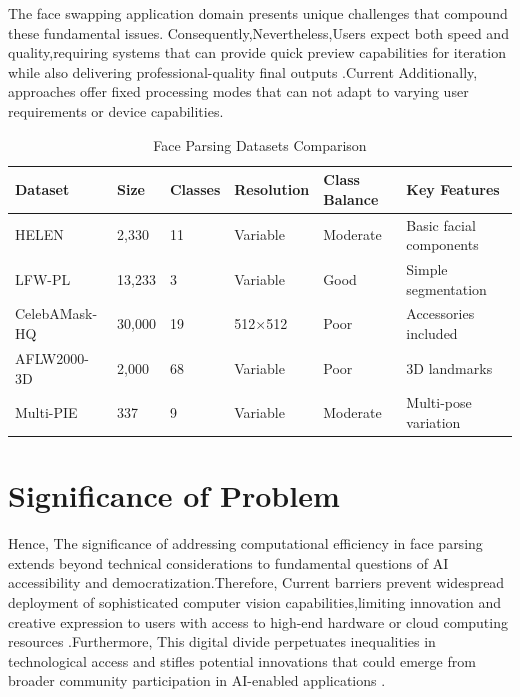 \documentclass[12pt,a4paper]{report}
\begin{document}
The face swapping application domain presents unique challenges that compound these fundamental issues. Consequently,Nevertheless,Users expect both speed and quality,requiring systems that can provide quick preview capabilities for iteration while also delivering professional-quality final outputs \cite{nirkin2019fsgan} .Current Additionally, approaches offer fixed processing modes that can not adapt to varying user requirements or device capabilities.

\begin{table}[H]
\centering
\caption{Face Parsing Datasets Comparison}
\label{tab:datasets_comparison}
\begin{tabular}{|p{2.5cm}|p{1.5cm}|p{1.5cm}|p{2cm}|p{1.5cm}|p{2cm}|}
\hline
\textbf{Dataset} & \textbf{Size} & \textbf{Classes} & \textbf{Resolution} & \textbf{Class Balance} & \textbf{Key Features} \\
\hline
HELEN \cite{le2012interactive} & 2,330 & 11 & Variable & Moderate & Basic facial components \\
\hline
LFW-PL \cite{kae2013augmenting} & 13,233 & 3 & Variable & Good & Simple segmentation \\
\hline
CelebAMask-HQ \cite{lee2020maskgan} & 30,000 & 19 & 512×512 & Poor & Accessories included \\
\hline
AFLW2000-3D \cite{zhu2016face} & 2,000 & 68 & Variable & Poor & 3D landmarks \\
\hline
Multi-PIE \cite{gross2010multi} & 337 & 9 & Variable & Moderate & Multi-pose variation \\
\hline
\end{tabular}
\end{table}

\section{Significance of Problem}

Hence, The significance of addressing computational efficiency in face parsing extends beyond technical considerations to fundamental questions of AI accessibility and democratization.Therefore, Current barriers prevent widespread deployment of sophisticated computer vision capabilities,limiting innovation and creative expression to users with access to high-end hardware or cloud computing resources \cite{strubell2019energy}.Furthermore, This digital divide perpetuates inequalities in technological access and stifles potential innovations that could emerge from broader community participation in AI-enabled applications \cite{birhane2021algorithmic}.
\end{document}
